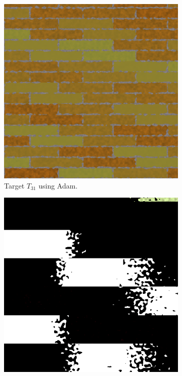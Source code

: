 \begin{figure}
\centering
\begin{subfigure}[t]{.25\textwidth}
    \centering
    \includegraphics[width=\linewidth]{img/evaluation/M3/2 param/Neural_Adam_2_param.png}
    \caption{Target $T_{31}$ using Adam.}
    \label{fig:M3NeuralFinalRendersTwoParamAdam}
\end{subfigure}\hspace{0.7cm}
\begin{subfigure}[t]{.25\textwidth}
    \centering
    \includegraphics[width=\linewidth]{img/evaluation/M3/random/Neural_Adam_random_final.png}

\end{subfigure}
\end{figure}
